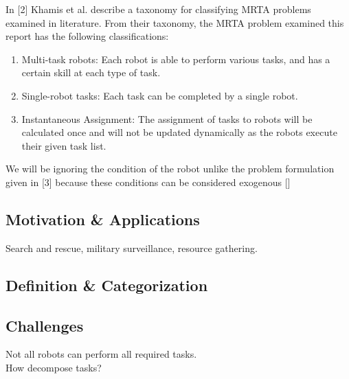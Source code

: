 \documentclass[a4paper]{article}
\begin{document}
In [2] Khamis et al. describe a taxonomy for classifying MRTA problems examined in literature. From their taxonomy, the MRTA problem examined this report has the following classifications:

\begin{enumerate}
\item Multi-task robots: Each robot is able to perform various tasks, and has a certain skill at each type of task.
\item Single-robot tasks: Each task can be completed by a single robot.
\item Instantaneous Assignment: The assignment of tasks to robots will be calculated once and will not be updated dynamically as the robots execute their given task list.
\end{enumerate}


We will be ignoring the condition of the robot unlike the problem formulation given in [3] because these conditions can be considered exogenous []

\subsection{Motivation \& Applications}
Search and rescue, military surveillance, resource gathering.

\subsection{Definition \& Categorization}

\subsection{Challenges}
Not all robots can perform all required tasks.\\
How decompose tasks?\\




\end{document}
